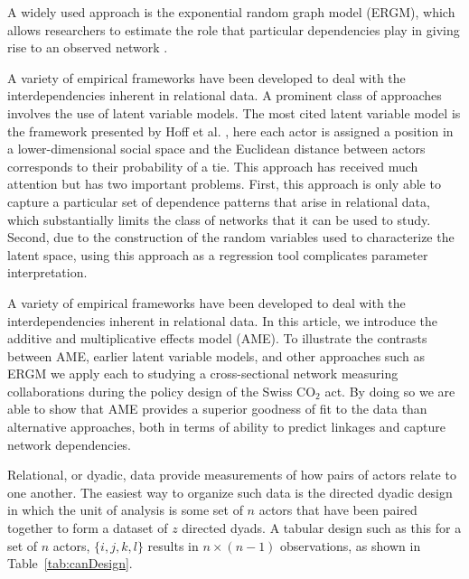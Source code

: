 \documentclass[9pt,twocolumn,twoside,lineno]{pnas-new}
\begin{document}
A widely used approach is the exponential random graph model (ERGM), which allows researchers to estimate the role that particular dependencies play in giving rise to an observed network \citep{frank:strauss:1986,wasserman:pattison:1996}.

A variety of empirical frameworks have been developed to deal with the interdependencies inherent in relational data. A prominent class of approaches involves the use of latent variable models. The most cited latent variable model is the framework presented by Hoff et al. \cite{hoff:etal:2002}, here each actor is assigned a position in a lower-dimensional social space and the Euclidean distance between actors corresponds to their probability of a tie. This approach has received much attention but has two important problems. First, this approach is only able to capture a particular set of dependence patterns that arise in relational data, which substantially limits the class of networks that it can be used to study. Second, due to the construction of the random variables used to characterize the latent space, using this approach as a regression tool complicates parameter interpretation.

A variety of empirical frameworks have been developed to deal with the interdependencies inherent in relational data. In this article, we introduce the additive and multiplicative effects model (AME). To illustrate the contrasts between AME, earlier latent variable models, and other approaches such as ERGM we apply each to studying a cross-sectional network measuring collaborations during the policy design of the Swiss CO$_{2}$ act. By doing so we are able to show that AME provides a superior goodness of fit to the data than alternative approaches, both in terms of ability to predict linkages and capture network dependencies. 


Relational, or dyadic, data provide measurements of how pairs of actors relate to one another. The easiest way to organize such data is the directed dyadic design in which the unit of analysis is some set of $n$ actors that have been paired together to form a dataset of $z$ directed dyads. A tabular design such as this for a set of $n$ actors, $\{i, j, k, l \}$ results in $n \times (n-1)$ observations, as shown in Table~\ref{tab:canDesign}. 
\end{document}

